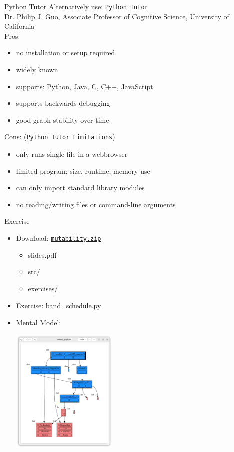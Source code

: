 \documentclass[10pt, colorlinks=true, urlcolor=blue]{beamer}
\begin{document}
\begin{frame}{Python Tutor}
  Alternatively use: \href{https://pythontutor.com/}{\texttt{Python Tutor}}\\
  {\small Dr. Philip J. Guo, Associate Professor of Cognitive Science, University of California}
  \vspace{1em}\\
  Pros:
  \begin{itemize}
  \item no installation or setup required
  \item widely known
  \item supports: Python, Java, C, C++, JavaScript
  \item supports backwards debugging
  \item good graph stability over time
  \end{itemize}
  Cons: (\href{https://docs.google.com/document/d/13_Bc-l2FKMgwPx4dZb0sv7eMfYMHhRVgBRShha8kgbU/}{\texttt{Python Tutor Limitations}})
  \begin{itemize}
  \item only runs single file in a webbrowser
  \item limited program: size, runtime, memory use
  \item can only import standard library modules
  \item no reading/writing files or command-line arguments
  \end{itemize}
\end{frame}

\begin{frame}{Exercise}
  \begin{itemize}
  \item Download: \href{https://raw.githubusercontent.com/bterwijn/memory_graph_videos/refs/heads/main/mutability/mutability.zip}{\texttt{mutability.zip}}
    \begin{itemize}
    \item slides.pdf
    \item src/
    \item exercises/
    \end{itemize}
  \item Exercise: band\_schedule.py
  \item Mental Model: \begin{center}\includegraphics[width=0.4\textwidth]{figures/band_schedule.png}\end{center}
  \end{itemize}
\end{frame}
\end{document}

